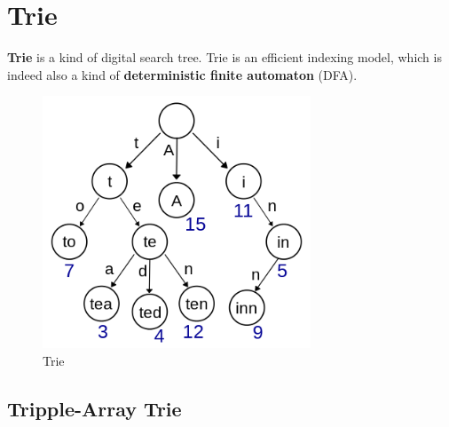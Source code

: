 \documentclass[a4paper, 12pt]{book} %
\begin{document}
\chapter{Trie}
\textbf{Trie} is a kind of digital search tree. Trie is an efficient indexing model, which is indeed also a kind of \textbf{deterministic finite automaton} (DFA).
\begin{figure}[htpb]
	\centering
	\includegraphics[width=8cm]{figures/trie.png}
	\caption{Trie}
	\label{fig:boat1}
\end{figure}
\section{Tripple-Array Trie}
\end{document}
